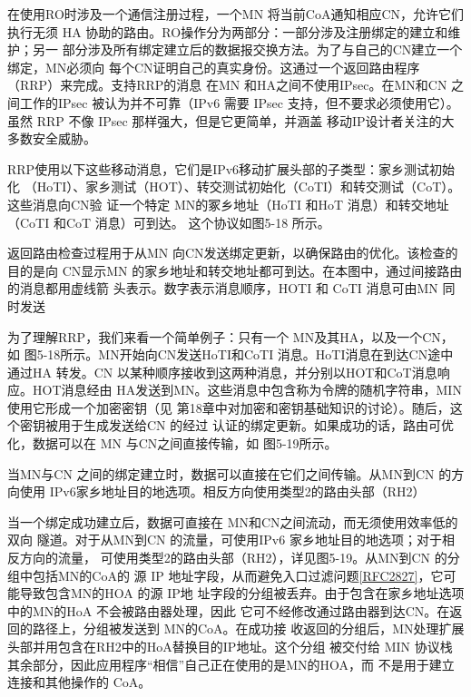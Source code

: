 在使用RO时涉及一个通信注册过程，一个MN 将当前CoA通知相应CN，允许它们
执行无须 HA 协助的路由。RO操作分为两部分：一部分涉及注册绑定的建立和维护；另一
部分涉及所有绑定建立后的数据报交换方法。为了与自己的CN建立一个绑定，MN必须向
每个CN证明自己的真实身份。这通过一个返回路由程序（RRP）来完成。支持RRP的消息
在MN 和HA之间不使用IPsec。在MN和CN 之间工作的IPsec 被认为并不可靠（IPv6 需要
IPsec 支持，但不要求必须使用它）。虽然 RRP 不像 IPsec 那样强大，但是它更简单，并涵盖
移动IP设计者关注的大多数安全威胁。

RRP使用以下这些移动消息，它们是IPv6移动扩展头部的子类型：家乡测试初始化
（HoTI）、家乡测试（HOT）、转交测试初始化（CoTI）和转交测试（CoT）。这些消息向CN验
证一个特定 MN的冢乡地址（HoTI 和HoT 消息）和转交地址（CoTI 和CoT 消息）可到达。
这个协议如图5-18 所示。

返回路由检查过程用于从MN 向CN发送绑定更新，以确保路由的优化。该检查的目的是向
CN显示MN 的家乡地址和转交地址都可到达。在本图中，通过间接路由的消息都用虚线箭
头表示。数字表示消息顺序，HOTI 和 CoTI 消息可由MN 同时发送

为了理解RRP，我们来看一个简单例子：只有一个 MN及其HA，以及一个CN，如
图5-18所示。MN开始向CN发送HoTI和CoTI 消息。HoTI消息在到达CN途中通过HA
转发。CN 以某种顺序接收到这两种消息，并分别以HOT和CoT消息响应。HOT消息经由
HA发送到MN。这些消息中包含称为令牌的随机字符串，MIN使用它形成一个加密密钥（见
第18章中对加密和密钥基础知识的讨论）。随后，这个密钥被用于生成发送给CN 的经过
认证的绑定更新。如果成功的话，路由可优化，数据可以在 MN 与CN之间直接传输，如
图5-19所示。

当MN与CN 之间的绑定建立时，数据可以直接在它们之间传输。从MN到CN 的方向使用
IPv6家乡地址目的地选项。相反方向使用类型2的路由头部（RH2）

当一个绑定成功建立后，数据可直接在 MN和CN之间流动，而无须使用效率低的双向
隧道。对于从MN到CN 的流量，可使用IPv6 家乡地址目的地选项；对于相反方向的流量，
可使用类型2的路由头部（RH2），详见图5-19。从MN到CN 的分组中包括MN的CoA的
源 IP 地址字段，从而避免入口过滤问题\href{https://www.rfc-editor.org/rfc/rfc2827}{[RFC2827]}，它可能导致包含MN的HOA 的源 IP地
址字段的分组被丢弃。由于包含在家乡地址选项中的MN的HoA 不会被路由器处理，因此
它可不经修改通过路由器到达CN。在返回的路径上，分组被发送到 MN的CoA。在成功接
收返回的分组后，MN处理扩展头部并用包含在RH2中的HoA替换目的IP地址。这个分组
被交付给 MIN 协议栈其余部分，因此应用程序“相信”自己正在使用的是MN的HOA，而
不是用于建立连接和其他操作的 CoA。

